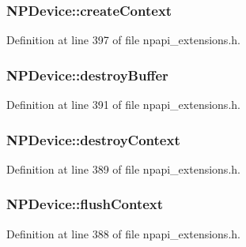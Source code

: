 \hypertarget{struct_n_p_device_a8b4e07ce1c1ae97fdc633ffd73fee9a3}{
\subsubsection[{createContext}]{ {\bf NPDevice::createContext}}}
\label{struct_n_p_device_a8b4e07ce1c1ae97fdc633ffd73fee9a3}


Definition at line 397 of file npapi\_\-extensions.h.

\hypertarget{struct_n_p_device_a86b73ff8acb883d14656b00bc6c0ce85}{
\subsubsection[{destroyBuffer}]{ {\bf NPDevice::destroyBuffer}}}
\label{struct_n_p_device_a86b73ff8acb883d14656b00bc6c0ce85}


Definition at line 391 of file npapi\_\-extensions.h.

\hypertarget{struct_n_p_device_a041234ca1d9cabfd58473ad825765175}{
\subsubsection[{destroyContext}]{ {\bf NPDevice::destroyContext}}}
\label{struct_n_p_device_a041234ca1d9cabfd58473ad825765175}


Definition at line 389 of file npapi\_\-extensions.h.

\hypertarget{struct_n_p_device_a2640def6763551de0f6311f8a45ea5f2}{
\subsubsection[{flushContext}]{ {\bf NPDevice::flushContext}}}
\label{struct_n_p_device_a2640def6763551de0f6311f8a45ea5f2}


Definition at line 388 of file npapi\_\-extensions.h.

